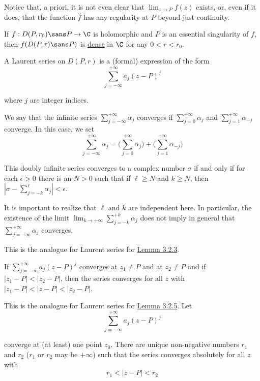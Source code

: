 Notice that, a priori, it is not even clear that $\lim_{z\to P}f(z)$ exists,
or, even if it does, that the function $\hat f$ has any regularity at $P$
beyond just continuity.

\label{da8365b}

If $f:D(P,r_0)\sans P\to\C$ is holomorphic and $P$ is an essential singularity
of $f$, then $f(D(P,r)\sans P)$ is \href{e14819a}{dense} in $\C$ for any
$0<r<r_0$.

\label{cb20929}

A Laurent series on $D(P,r)$ is a (formal) expression of the form
$$
  \sum_{j=-\infty}^{+\infty} a_j(z-P)^j
$$

where $j$ are integer indices.

We say that the infinite series $\sum_{j=-\infty}^{+\infty}\alpha_j$ converges
if $\sum_{j=0}^{+\infty}\alpha_j$ and $\sum_{j=1}^{+\infty}\alpha_{-j}$
converge. In this case, we set
$$
  \sum_{j=-\infty}^{+\infty}\alpha_j=
  \bigg(\sum_{j=0}^{+\infty}\alpha_j\bigg)+
  \bigg(\sum_{j=1}^{+\infty}\alpha_{-j}\bigg)
$$

This doubly infinite series converges to a complex number $\sigma$ if and only
if for each $\epsilon>0$ there is an $N>0$ such that if $\ell\geq N$ and $k\geq
N$, then $|\sigma-\sum_{j=-k}^\ell\alpha_j|<\epsilon$.

It is important to realize that $\ell$ and $k$ are independent here. In
particular, the existence of the limit
$\lim_{k\to+\infty}\sum_{j=-k}^{+k}\alpha_j$ does not imply in general that
$\sum_{j=-\infty}^{+\infty}\alpha_j$ converges.

\label{d5253d9}

This is the analogue for Laurent series for \href{d5d5bdc}{Lemma 3.2.3}.

If $\sum_{j=-\infty}^{+\infty}a_j(z-P)^j$ converges at $z_1\neq P$ and at
$z_2\neq P$ and if $|z_1-P|<|z_2-P|$, then the series converges for all $z$
with $|z_1-P|<|z-P|<|z_2-P|$.

\label{a9a7710}

This is the analogue for Laurent series for \href{c7d0e1d}{Lemma 3.2.5}. Let
$$
  \sum_{j=-\infty}^{+\infty}a_j(z-P)^j
$$

converge at (at least) one point $z_0$. There are unique non-negative numbers
$r_1$ and $r_2$ ($r_1$ or $r_2$ may be $+\infty$) such that the series
converges absolutely for all $z$ with
$$
  r_1<|z-P|<r_2
$$

